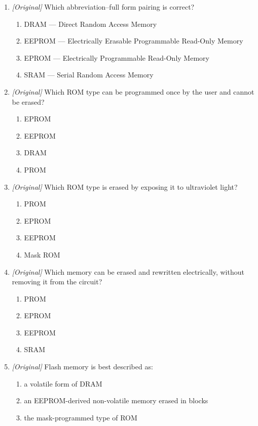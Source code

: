 \begin{enumerate}[label=\textbf{Q\arabic*.}, leftmargin=*]
\begin{enumerate}[label=\Alph*.]
  \end{enumerate}
\item \textit{[Original]} Which abbreviation--full form pairing is correct?
  \begin{enumerate}[label=\Alph*.]
    \item DRAM --- Direct Random Access Memory
    \item EEPROM --- Electrically Erasable Programmable Read-Only Memory
    \item EPROM --- Electrically Programmable Read-Only Memory
    \item SRAM --- Serial Random Access Memory
  \end{enumerate}
\item \textit{[Original]} Which ROM type can be programmed once by the user
  and cannot be erased?
  \begin{enumerate}[label=\Alph*.]
    \item EPROM
    \item EEPROM
    \item DRAM
    \item PROM
  \end{enumerate}
\item \textit{[Original]} Which ROM type is erased by exposing it to
  ultraviolet light?
  \begin{enumerate}[label=\Alph*.]
    \item PROM
    \item EPROM
    \item EEPROM
    \item Mask ROM
  \end{enumerate}
\item \textit{[Original]} Which memory can be erased and rewritten
  electrically, without removing it from the circuit?
  \begin{enumerate}[label=\Alph*.]
    \item PROM
    \item EPROM
    \item EEPROM
    \item SRAM
  \end{enumerate}
\item \textit{[Original]} Flash memory is best described as:
  \begin{enumerate}[label=\Alph*.]
    \item a volatile form of DRAM
    \item an EEPROM-derived non-volatile memory erased in blocks
    \item the mask-programmed type of ROM

\end{enumerate}
\end{enumerate}
